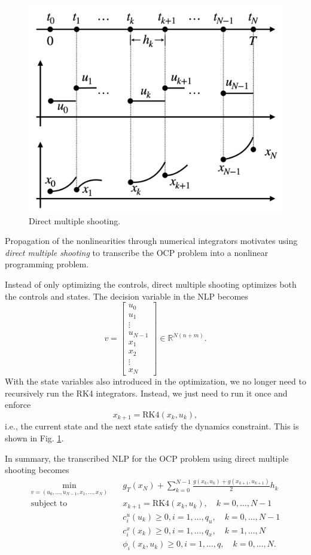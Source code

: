 \documentclass[
]{book}
\theoremstyle{definition}
\theoremstyle{definition}
\theoremstyle{definition}
\theoremstyle{definition}
\theoremstyle{remark}
\begin{document}
\begin{figure}

{\centering \includegraphics[width=0.6\linewidth]{images/direct_multiple_shooting} 

}

\caption{Direct multiple shooting.}\label{fig:direct-multiple-shooting}
\end{figure}

Propagation of the nonlinearities through numerical integrators motivates using \emph{direct multiple shooting} to transcribe the OCP problem into a nonlinear programming problem.

Instead of only optimizing the controls, direct multiple shooting optimizes both the controls and states. The decision variable in the NLP becomes
\[
v = \begin{bmatrix}
u_0 \\ u_1 \\ \vdots \\ u_{N-1} \\ x_1 \\ x_2 \\ \vdots \\ x_N \end{bmatrix} \in \mathbb{R}^{N(n+m)}.
\]
With the state variables also introduced in the optimization, we no longer need to recursively run the RK4 integrators. Instead, we just need to run it once and enforce
\[
x_{k+1} = \text{RK4}(x_k, u_k),
\]
i.e., the current state and the next state satisfy the dynamics constraint. This is shown in Fig. \ref{fig:direct-multiple-shooting}.

In summary, the transcribed NLP for the OCP problem using direct multiple shooting becomes
\begin{equation}
\begin{split}
\min_{v = (u_0,\dots,u_{N-1},x_1,\dots,x_N)} & \quad g_T(x_N) + \sum_{k=0}^{N-1} \frac{g(x_k,u_k) + g(x_{k+1},u_{k+1})}{2} h_k \\
\text{subject to} & \quad x_{k+1} = \text{RK4}(x_k, u_k), \quad k=0,\dots,N-1 \\
& \quad c^u_i (u_k) \geq 0, i=1,\dots,q_u, \quad k=0,\dots,N-1 \\
& \quad c^x_i(x_k) \geq 0, i=1,\dots,q_x, \quad k=1,\dots,N \\
& \quad \phi_i(x_k, u_k) \geq 0, i=1,\dots,q, \quad k=0,\dots,N.
\end{split}
\label{eq:ocp-direct-multiple-shooting}
\end{equation}
\end{document}
